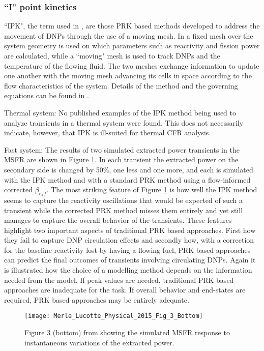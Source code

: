 \documentclass[review]{elsarticle}
\begin{document}
\subsubsection{``I" point kinetics} \label{sssec:spk}
``IPK", the term used in \cite{merle-lucotte_physical_2015},
are those PRK based methods developed to address the
movement of DNPs through the use of a moving mesh. In
\cite{merle-lucotte_physical_2015} a fixed mesh over the system geometry
is used on which parameters
such as reactivity and fission power are calculated, while a ``moving" mesh is
used to track DNPs and the temperature of the flowing fluid. The two
meshes exchange information to update one another with the moving mesh advancing
its cells in space according to the flow characteristics of the system.
Details of the method and
the governing equations can be found in \cite{merle-lucotte_physical_2015}.
\par Thermal system: No published examples of the IPK method being used
to analyze transients in a thermal system were found. This does not
necessarily indicate, however, that IPK is ill-suited for thermal CFR
analysis.
\par Fast system: The results of two simulated extracted power transients
in the MSFR are shown in Figure \ref{fig:lucotte_ipk}. 
In each transient the extracted power on the secondary side is changed by
50\%, one less and one more, and each is simulated with the IPK method and with a
standard PRK method using a flow-informed corrected $\beta_{eff}$. The most striking
feature of Figure \ref{fig:lucotte_ipk} is how well the IPK method seems to capture
the reactivity oscillations that would be expected of such a transient while the
corrected PRK method misses them entirely and yet still manages to capture the
overall behavior of the transients. These features highlight two important aspects
of traditional PRK
based approaches. First how they fail to capture DNP circulation effects and secondly
how, with a correction for the baseline reactivity lost by having a flowing fuel,
PRK based approaches can predict the final outcomes of transients involving
circulating DNPs. Again it is illustrated how the choice of a modelling method
depends on the information needed from the model. If peak values are needed,
traditional PRK based approaches are inadequate for the task. If overall behavior
and end-states are required, PRK based approaches may be entirely adequate.

\begin{figure}[H]
   \centering
   \texttt{[image: Merle\_Lucotte\_Physical\_2015\_Fig\_3\_Bottom]}
   \caption{Figure 3 (bottom) from \cite{merle-lucotte_physical_2015} showing the simulated MSFR
   response to instantaneous variations of the extracted power.} 
   \label{fig:lucotte_ipk}
\end{figure}
\end{document}
